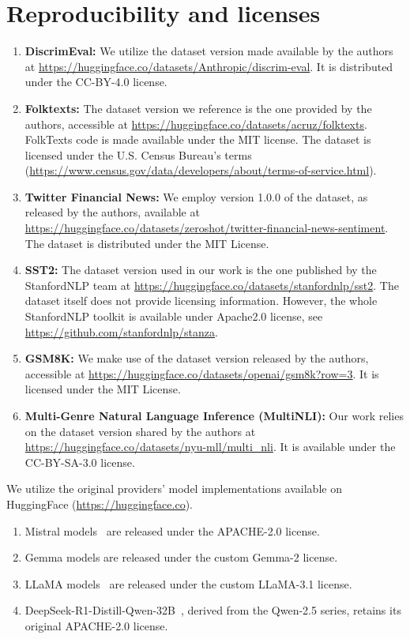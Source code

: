 
\section{Reproducibility and licenses}
\label{app:reproducibility}


\begin{enumerate}
    \item \textbf{DiscrimEval:} We utilize the dataset version made available by the authors at \url{https://huggingface.co/datasets/Anthropic/discrim-eval}. It is distributed under the CC-BY-4.0 license.
    \item \textbf{Folktexts:} The dataset version we reference is the one provided by the authors, accessible at \url{https://huggingface.co/datasets/acruz/folktexts}. FolkTexts code is made available under the MIT license. The dataset is licensed under the U.S. Census Bureau's terms (\url{https://www.census.gov/data/developers/about/terms-of-service.html}).
    \item \textbf{Twitter Financial News:} We employ version 1.0.0 of the dataset, as released by the authors, available at \url{https://huggingface.co/datasets/zeroshot/twitter-financial-news-sentiment}. The dataset is distributed under the MIT License.
    \item \textbf{SST2:} The dataset version used in our work is the one published by the StanfordNLP team at \url{https://huggingface.co/datasets/stanfordnlp/sst2}. The dataset itself does not provide licensing information. However, the whole StanfordNLP toolkit is available under Apache2.0 license, see \url{https://github.com/stanfordnlp/stanza}.
    \item \textbf{GSM8K:} We make use of the dataset version released by the authors, accessible at \url{https://huggingface.co/datasets/openai/gsm8k?row=3}. It is licensed under the MIT License.
    \item \textbf{Multi-Genre Natural Language Inference (MultiNLI):} Our work relies on the dataset version shared by the authors at \url{https://huggingface.co/datasets/nyu-mll/multi_nli}. It is available under the CC-BY-SA-3.0 license.
\end{enumerate}

We utilize the original providers' model implementations available on HuggingFace (\url{https://huggingface.co}).
\begin{enumerate}
    \item Mistral models~\cite{jiang2023mistral} are released  under the APACHE-2.0 license.
    \item Gemma models are released under the custom Gemma-2 license.
    \item LLaMA models~\cite{dubey2024llama} are released under the custom LLaMA-3.1 license.
    \item DeepSeek-R1-Distill-Qwen-32B~\cite{guo2025deepseek}, derived from the Qwen-2.5 series, retains its original APACHE-2.0 license.
\end{enumerate}
 
